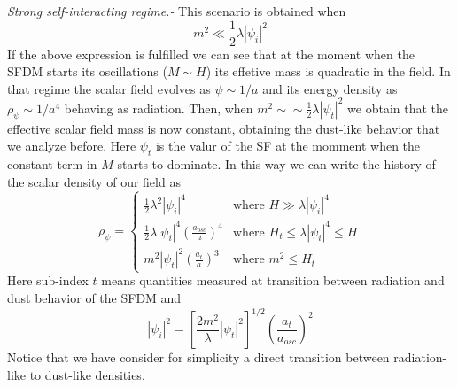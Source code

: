 \documentclass[twocolumn,           %
               showpacs,            %
               preprintnumbers,     %
               aps,                 %
               prl,          	    %
               letterpaper,             %
               superscriptaddress,      %
               nofootinbib,         %
               tightenlines,        %
               floats,floatfix      %
               ,usenatbib,
               ]{revtex4-1}
\begin{document}
\textit{Strong self-interacting regime.-} This scenario is obtained when 
\begin{equation}
m^2\ll \frac{1}{2}\lambda|\psi_i|^2
\end{equation}
If the above expression is fulfilled we can see that at the moment when the SFDM starts its oscillations ($M\sim H$) its effetive mass is quadratic in the field. In that regime the scalar field evolves as $\psi\sim 1/a$ and its energy density as $\rho_{\psi}\sim 1/a^4$ behaving as radiation. Then, when $m^2\sim \sim \frac{1}{2}\lambda|\psi_t|^2$ we obtain that the effective scalar field mass is now constant, obtaining the dust-like behavior that we analyze before. Here $\psi_t$ is the valur of the SF at the momment when the constant term in $M$ starts to dominate. In this way we can write the history of the scalar density of our field as
\begin{equation}\label{rhosfdmlam}
\rho_\psi = \left\lbrace\begin{array}{ll}
\frac{1}{2}\lambda^2|\psi_i|^4 & \text{where }H\gg \lambda|\psi_i|^4 \\
\frac{1}{2}\lambda|\psi_i|^4\left(\frac{a_{osc}}{a}\right)^4 & \text{where }H_t\leq \lambda|\psi_i|^4\leq H\\
m^2|\psi_t|^2\left(\frac{a_t}{a}\right)^3 & \text{where } m^2\leq H_t
\end{array}\right .
\end{equation}
Here sub-index $t$ means quantities measured at transition between radiation and dust behavior of the SFDM and
\begin{equation}\label{inilamb}
|\psi_i|^2=\left[\frac{2m^2}{\lambda}|\psi_t|^2\right]^{1/2}\left(\frac{a_t}{a_{osc}}\right)^2
\end{equation}
Notice that we have consider for simplicity a direct transition between radiation-like to dust-like densities. 
\end{document}
